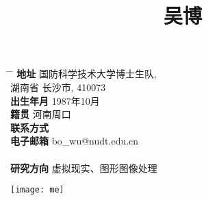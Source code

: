 \documentclass[20pt]{article} %
\begin{document}

\title{吴博} %
\begin{minipage}{0.5\textwidth}
\centering
\begin{tabbing}%
\hspace{3cm} \= \hspace{4cm} \= \kill %
{\bf 地址} \> 国防科学技术大学博士生队,\\%
\> 湖南省 长沙市, 410073 \\%
{\bf 出生年月} \> 1987年10月 \\ %
{\bf 籍贯} \> 河南周口 \\%
{\bf 联系方式}  \\ %
{\bf 电子邮箱} \> bo_wu@nudt.edu.cn \\ \\%
{\bf 研究方向} \> 虚拟现实、图形图像处理 \\ %
\end{tabbing}%
\end{minipage}
\begin{minipage}{0.5\textwidth}
\hspace{3cm}
  \texttt{[image: me]}\\
\end{minipage}
\end{document}
